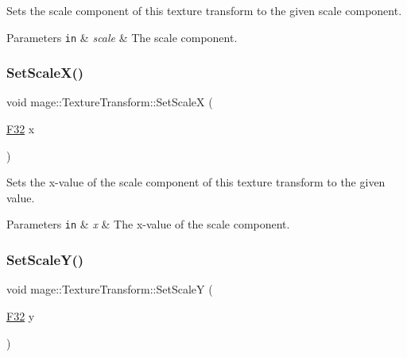 Sets the scale component of this texture transform to the given scale component.


\begin{DoxyParams}[1]{Parameters}
\mbox{\tt in}  & {\em scale} & The scale component. \\
\hline
\end{DoxyParams}
\mbox{\label{classmage_1_1_texture_transform_ae038a7bf4d879c67e898db1fc8093900}} 
\subsubsection{\texorpdfstring{Set\+Scale\+X()}{SetScaleX()}}
{\footnotesize\ttfamily void mage\+::\+Texture\+Transform\+::\+Set\+ScaleX (\begin{DoxyParamCaption}\item[{\mbox{\hyperlink{namespacemage_aa97e833b45f06d60a0a9c4fc22ae02c0}{F32}}}]{x }\end{DoxyParamCaption})\hspace{0.3cm}{\ttfamily [noexcept]}}

Sets the x-\/value of the scale component of this texture transform to the given value.


\begin{DoxyParams}[1]{Parameters}
\mbox{\tt in}  & {\em x} & The x-\/value of the scale component. \\
\hline
\end{DoxyParams}
\mbox{\label{classmage_1_1_texture_transform_a4bde9ccfddadb77589d0703bd7e394b6}} 
\subsubsection{\texorpdfstring{Set\+Scale\+Y()}{SetScaleY()}}
{\footnotesize\ttfamily void mage\+::\+Texture\+Transform\+::\+Set\+ScaleY (\begin{DoxyParamCaption}\item[{\mbox{\hyperlink{namespacemage_aa97e833b45f06d60a0a9c4fc22ae02c0}{F32}}}]{y }\end{DoxyParamCaption})\hspace{0.3cm}{\ttfamily [noexcept]}}

